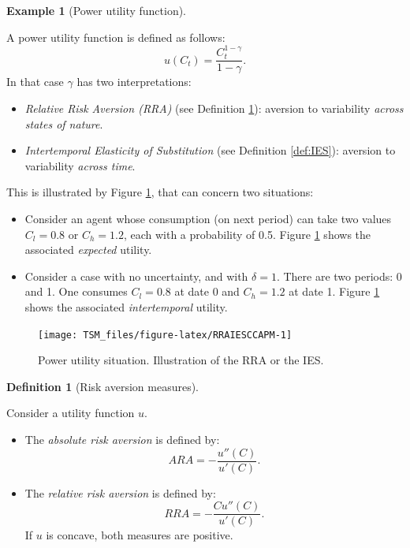 \documentclass[
  12pt,
]{book}
\providecommand{\tightlist}{%
  \setlength{\itemsep}{0pt}\setlength{\parskip}{0pt}}
\theoremstyle{definition}
\newtheorem{definition}{Definition}[chapter]
\theoremstyle{definition}
\newtheorem{example}{Example}[chapter]
\theoremstyle{definition}
\theoremstyle{definition}
\theoremstyle{remark}
\begin{document}
\begin{example}[Power utility function]
\protect\hypertarget{exm:powerU}{}\label{exm:powerU}

A power utility function is defined as follows:
\[
u(C_t) = \frac{C_t^{1-\gamma}}{1 - \gamma}.
\]
In that case \(\gamma\) has two interpretations:

\begin{itemize}
\tightlist
\item
  \emph{Relative Risk Aversion (RRA)} (see Definition \ref{def:RAmeasures}): aversion to variability \emph{across states of nature}.
\item
  \emph{Intertemporal Elasticity of Substitution} (see Definition \ref{def:IES}): aversion to variability \emph{across time}.
\end{itemize}

This is illustrated by Figure \ref{fig:RRAIESCCAPM}, that can concern two situations:

\begin{itemize}
\tightlist
\item
  Consider an agent whose consumption (on next period) can take two values \(C_l= 0.8\) or \(C_h= 1.2\), each with a probability of 0.5. Figure \ref{fig:RRAIESCCAPM} shows the associated \emph{expected} utility.
\item
  Consider a case with no uncertainty, and with \(\delta=1\). There are two periods: 0 and 1. One consumes \(C_l=0.8\) at date 0 and \(C_h=1.2\) at date 1. Figure \ref{fig:RRAIESCCAPM} shows the associated \emph{intertemporal} utility.
\end{itemize}

\begin{figure}
\texttt{[image: TSM\_files/figure-latex/RRAIESCCAPM-1]} \caption{Power utility situation. Illustration of the RRA or the IES.}\label{fig:RRAIESCCAPM}
\end{figure}

\end{example}

\begin{definition}[Risk aversion measures]
\protect\hypertarget{def:RAmeasures}{}\label{def:RAmeasures}

Consider a utility function \(u\).

\begin{itemize}
\tightlist
\item
  The \emph{absolute risk aversion} is defined by:
  \[
  ARA = - \frac{u''(C)}{u'(C)}.
  \]
\item
  The \emph{relative risk aversion} is defined by:
  \[
  RRA = - \frac{C u''(C)}{u'(C)}.
  \]
  If \(u\) is concave, both measures are positive.
\end{itemize}

\end{definition}
\end{document}
